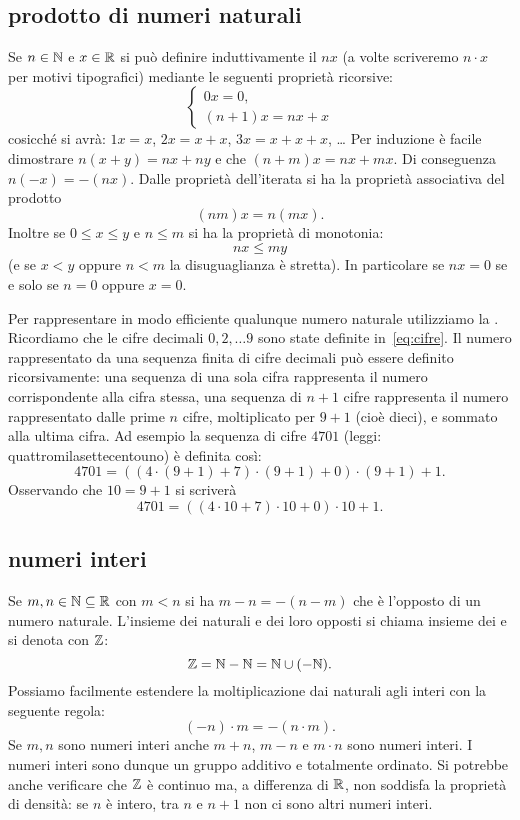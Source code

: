 \subsection{prodotto di numeri naturali}

Se $n\in {\mathbb N}$ e $x\in {\mathbb R}$ 
si può definire induttivamente il  $n x$
(a volte scriveremo $n\cdot x$ per motivi tipografici)
mediante le seguenti proprietà ricorsive:
\[
\begin{cases}
   0 x = 0,\\
   (n+1) x = n x + x
\end{cases}
\]
cosicché si avrà: $1x = x$, $2x=x+x$, $3x=x+x+x$, \dots
Per induzione è facile dimostrare $n(x+y) = nx + ny$ 
e che $(n+m)x = nx + mx$. 
Di conseguenza $n(-x) = -(n x)$.
Dalle proprietà dell'iterata si ha la proprietà associativa del prodotto
\[
 (nm)x = n(mx).  
\]
Inoltre se 
$0 \le x \le y$ e $n \le m$ si ha la proprietà di monotonia:
\[
  n x \le m y
\]
(e se $x<y$ oppure $n<m$ la disuguaglianza è stretta).
In particolare se $n x = 0$ se e solo se $n=0$ oppure $x=0$.

Per rappresentare in modo efficiente qualunque numero naturale utilizziamo la 
.
Ricordiamo che le cifre decimali $0,2,\dots 9$ sono state definite in~\eqref{eq:cifre}.
Il numero rappresentato da una sequenza finita di cifre decimali può essere 
definito ricorsivamente: una sequenza di una sola cifra rappresenta il numero 
corrispondente alla cifra stessa, una sequenza di $n+1$ cifre rappresenta il 
numero rappresentato dalle prime $n$ cifre, moltiplicato per $9+1$ (cioè dieci),
e sommato alla ultima cifra. 
Ad esempio la sequenza di cifre $4701$ (leggi: quattromilasettecentouno)
è definita così:
\[ 
  4701 = ((4\cdot(9+1)+7)\cdot(9+1)+0)\cdot(9+1)+1.
\]
Osservando che $10 = 9+1$ si scriverà
\[
  4701 = ((4\cdot 10 + 7)\cdot 10 +0)\cdot 10 + 1.  
\]

\subsection{numeri interi}

Se $m,n\in {\mathbb N} \subseteq {\mathbb R}$ con $m < n$ si ha $m - n = -(n-m)$ che è l'opposto di un numero naturale.
L'insieme dei naturali e dei loro opposti si chiama insieme dei 
 e si denota con $\ZZ$:
\index{$\ZZ$}%
\[
  {\mathbb Z} = {\mathbb N} - {\mathbb N} = {\mathbb N} \cup (-{\mathbb N}).  
\]
Possiamo facilmente estendere la moltiplicazione dai naturali agli interi 
con la seguente regola:
\[
  (-n)\cdot m = -(n\cdot m).
\]
Se $m,n$ sono numeri interi anche $m+n$, $m-n$ e $m\cdot n$ sono numeri interi.
I numeri interi sono dunque un gruppo additivo e totalmente ordinato.
Si potrebbe anche verificare che $\ZZ$ è continuo
ma, a differenza di ${\mathbb R}$, non soddisfa la proprietà di densità:
se $n$ è intero, tra $n$ e $n+1$ non ci sono altri numeri interi.

